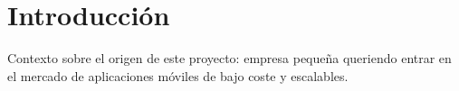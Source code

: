 \chapter{Introducción}
Contexto sobre el origen de este proyecto: empresa pequeña queriendo entrar en el mercado de aplicaciones móviles de bajo coste y escalables.